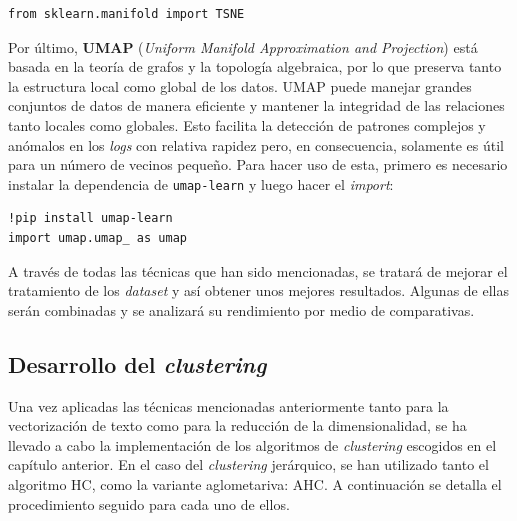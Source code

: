 \begin{center}
    \begin{mdframed}
    \scriptsize
            \begin{verbatim}
from sklearn.manifold import TSNE
            \end{verbatim}
    \end{mdframed}
\end{center}

Por último, \textbf{\gls{UMAP}} (\textit{Uniform Manifold Approximation and Projection}) \cite{McInnes2018UMAP} está basada en la teoría de grafos y la topología algebraica, por lo que preserva tanto la estructura local como global de los datos. \gls{UMAP} puede manejar grandes conjuntos de datos de manera eficiente y mantener la integridad de las relaciones tanto locales como globales. Esto facilita la detección de patrones complejos y anómalos en los \textit{logs} con relativa rapidez pero, en consecuencia, solamente es útil para un número de vecinos pequeño. Para hacer uso de esta, primero es necesario instalar la dependencia de \verb|umap-learn| y luego hacer el \textit{import}:

\begin{center}
    \begin{mdframed}
    \scriptsize
            \begin{verbatim}
!pip install umap-learn
import umap.umap_ as umap
            \end{verbatim}
    \end{mdframed}
\end{center}

A través de todas las técnicas que han sido mencionadas, se tratará de mejorar el tratamiento de los \textit{dataset} y así obtener unos mejores resultados. Algunas de ellas serán combinadas y se analizará su rendimiento por medio de comparativas.

\subsection{Desarrollo del \textit{clustering}}

Una vez aplicadas las técnicas mencionadas anteriormente tanto para la vectorización de texto como para la reducción de la dimensionalidad, se ha llevado a cabo la implementación de los algoritmos de \textit{clustering} escogidos en el capítulo anterior. En el caso del \textit{clustering} jerárquico, se han utilizado tanto el algoritmo \gls{HC}, como la variante aglometariva: \gls{AHC}. A continuación se detalla el procedimiento seguido para cada uno de ellos.

